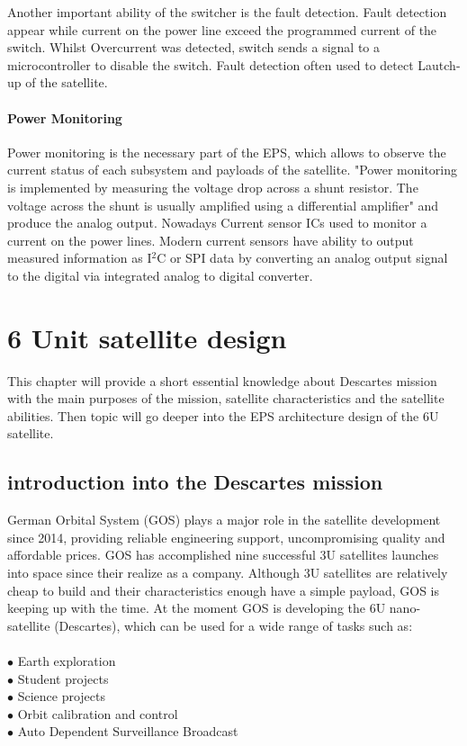 Another important ability of the switcher is the fault detection. Fault detection appear while current on the power line exceed the programmed current of the switch. Whilst Overcurrent was detected, switch sends a signal to a microcontroller to disable the switch. Fault detection often used to detect Lautch-up of the satellite.\\

\subsubsection{Power Monitoring}

Power monitoring is the necessary part of the EPS, which allows to observe the current status of each subsystem and payloads of the satellite. \cite{22} "Power monitoring is implemented by measuring the 
voltage drop across a shunt resistor.  The voltage across the shunt  is  usually  amplified  using  a  differential amplifier" and produce the analog output. Nowadays Current sensor ICs used to monitor a current on the power lines. Modern current sensors have ability to output measured information as I$^{2}$C or SPI data by converting an analog output signal to the digital via integrated analog to digital converter. 

\newpage   
\chapter{6 Unit satellite design}
This chapter will provide a short essential knowledge about Descartes mission with the main purposes of the mission, satellite characteristics and the satellite  abilities. Then topic will go deeper into the EPS architecture design of the 6U satellite. \\
\section{introduction into the Descartes mission}

German Orbital System (GOS) plays a major role in the satellite development since 2014, providing reliable engineering support, uncompromising quality and affordable prices. GOS has accomplished nine successful 3U satellites launches into space since their realize as a company. Although 3U satellites are relatively cheap to build and their characteristics enough have a simple payload, GOS is keeping up with the time. At the moment GOS is developing the 6U nano-satellite (Descartes), which can be used for a wide range of tasks such as:\\ \\
$\bullet$ Earth exploration\\ 
$\bullet$ Student projects\\ 
$\bullet$ Science projects\\ 
$\bullet$ Orbit calibration and control\\ 
$\bullet$ Auto Dependent Surveillance Broadcast\\ 




